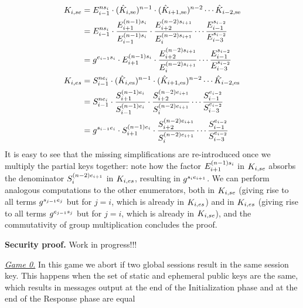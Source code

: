 \begin{align*}
	K_{i,se} &= E_{i-1}^{ns_i} \cdot (\hat{K}_{i,\text{se}})^{n-1} \cdot (\hat{K}_{i+1,\text{se}})^{n-2} \cdots \hat{K}_{i-2,\text{se}} \\
	&= E_{i-1}^{ns_i} \cdot  \dfrac{E_{i+1}^{(n-1)s_i}}{E_{i-1}^{(n-1)s_i}} \cdot \dfrac{E_{i+2}^{(n-2)s_{i+1}}}{E_{i}^{(n-2)s_{i+1}}} \cdots  \dfrac{E_{i-1}^{s_{i-2}}}{E_{i-3}^{s_{i-2}}}  \\
	&= g^{e_{i-1}s_i} \cdot E_{i+1}^{(n-1)s_i} \cdot \dfrac{E_{i+2}^{(n-2)s_{i+1}}}{E_{i}^{(n-2)s_{i+1}}} \cdots  \dfrac{E_{i-1}^{s_{i-2}}}{E_{i-3}^{s_{i-2}}}  \\
	K_{i,es} &= S_{i-1}^{ne_i} \cdot (\hat{K}_{i,\text{es}})^{n-1} \cdot (\hat{K}_{i+1,\text{es}})^{n-2} \cdots \hat{K}_{i-2,\text{es}}  \\
	&= S_{i-1}^{ne_i} \cdot  \dfrac{S_{i+1}^{(n-1)e_i}}{S_{i-1}^{(n-1)e_i}} \cdot \dfrac{S_{i+2}^{(n-2)e_{i+1}}}{S_{i}^{(n-2)e_{i+1}}} \cdots  \dfrac{S_{i-1}^{e_{i-2}}}{S_{i-3}^{e_{i-2}}}  \\
	&= g^{s_{i-1}e_i} \cdot S_{i+1}^{(n-1)e_i} \cdot \dfrac{S_{i+2}^{(n-2)e_{i+1}}}{S_{i}^{(n-2)e_{i+1}}} \cdots  \dfrac{S_{i-1}^{e_{i-2}}}{S_{i-3}^{e_{i-2}}}  \\
\end{align*}
It is easy to see that the missing simplifications are re-introduced once we multiply the partial keys together: note how the factor $E_{i+1}^{(n-1)s_i}$ in $K_{i,se}$ absorbs the denominator ${S_{i}^{(n-2)e_{i+1}}}$ in $K_{i,es}$, resulting in $g^{s_i e_{i+1}}$.
We can perform analogous computations to the other enumerators, both in $K_{i,se}$ (giving rise to all terms $g^{s_{j-1}e_j}$ but for $j=i$, which is already in $K_{i,es}$) and in $K_{i,es}$ (giving rise to all terms $g^{e_{j-1}s_j}$ but for $j=i$, which is already in $K_{i,se}$), and the commutativity of group multiplication concludes the proof.\medskip

\textbf{Security proof.}
Work in progress!!!

\underline{\textit{Game 0.}}
In this game we abort if two global sessions result in the same session key. This happens when the set of static and ephemeral public keys are the same, which results in  messages output at the end of the Initialization phase and at the end of the Response phase are equal